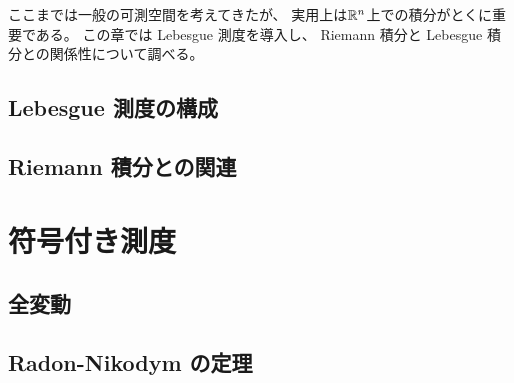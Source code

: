 \documentclass[report]{jlreq}
\begin{document}
ここまでは一般の可測空間を考えてきたが、
実用上は$\mathbb{R}^n$上での積分がとくに重要である。
この章では Lebesgue 測度を導入し、
Riemann 積分と Lebesgue 積分との関係性について調べる。

%
\section{Lebesgue 測度の構成}

\begin{definition}
    \TODO{}
\end{definition}

%
\section{Riemann 積分との関連}




%
\chapter{符号付き測度}

%
\section{全変動}


\begin{definition}[全変動]
    \TODO{}
\end{definition}

%
\section{Radon-Nikodym の定理}

\begin{definition}[絶対連続と特異]
    \TODO{}
\end{definition}
\end{document}
